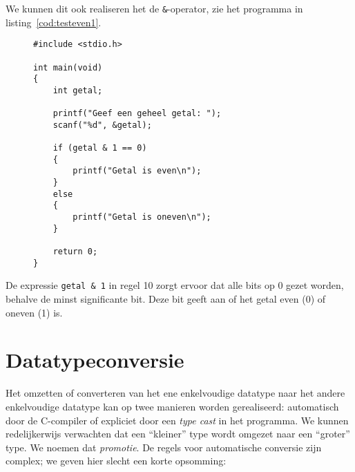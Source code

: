 We kunnen dit ook realiseren het de \texttt{\&}-operator, zie het programma in listing~\ref{cod:testeven1}.
%
\begin{figure}[!t]
\begin{lstlisting}[caption=Testen of een geheel getal even is.,label=cod:testeven1]
#include <stdio.h>

int main(void)
{
    int getal;
    
    printf("Geef een geheel getal: ");
    scanf("%d", &getal);
    
    if (getal & 1 == 0)
    {
        printf("Getal is even\n");
    } 
    else
    {
        printf("Getal is oneven\n");
    }
    
    return 0;
}
\end{lstlisting}
\end{figure}
%
De expressie \texttt{getal \& 1} in regel 10 zorgt ervoor dat alle bits op 0 gezet worden, behalve de minst significante bit. Deze bit geeft aan of het getal even (0) of oneven (1) is.



\section{Datatypeconversie}
Het omzetten of converteren van het ene enkelvoudige datatype naar het andere enkelvoudige datatype kan op twee manieren worden gerealiseerd: automatisch door de C-compiler of expliciet door een \textsl{type cast} in het programma. We kunnen redelijkerwijs verwachten dat een ``kleiner'' type wordt omgezet naar een ``groter'' type. We noemen dat \textsl{promotie}. De regels voor automatische conversie zijn complex; we geven hier slecht een korte opsomming:

